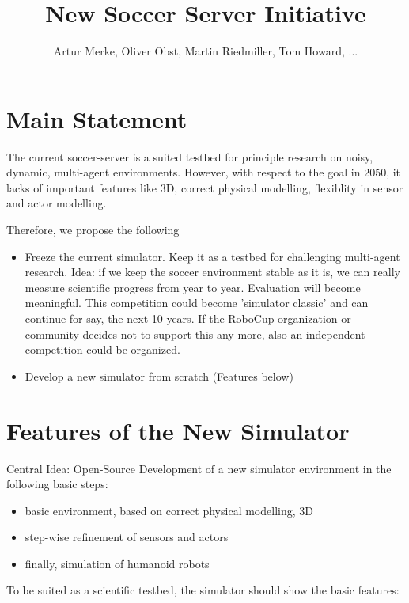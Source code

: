 \documentclass[a4paper,12pt]{article}
\begin{document}
\title{New Soccer Server Initiative}
\author{Artur Merke, Oliver Obst, Martin Riedmiller, Tom Howard, ...}

\maketitle

\section{Main Statement}

The current soccer-server is a suited testbed for principle research
on noisy, dynamic, multi-agent environments. However, with respect to
the goal in 2050, it lacks of important features like 3D, correct
physical modelling, flexiblity in sensor and actor modelling.

Therefore, we propose the following

\begin{itemize}
\item Freeze the current simulator. Keep it as a testbed for
  challenging multi-agent research.  Idea: if we keep the soccer
  environment stable as it is, we can really measure scientific
  progress from year to year. Evaluation will become meaningful.  This
  competition could become 'simulator classic' and can continue for
  say, the next 10 years.  If the RoboCup organization or community
  decides not to support this any more, also an independent
  competition could be organized.
\item Develop a new simulator from scratch (Features below)
\end{itemize}

\section{Features of the New Simulator}

Central Idea: Open-Source Development of a new simulator environment
in the following basic steps:

\begin{itemize}
\item basic environment, based on correct physical modelling, 3D
\item step-wise refinement of sensors and actors
\item finally, simulation of  humanoid robots
\end{itemize}

To be suited as a scientific testbed, the simulator should show the basic features:
\end{document}
